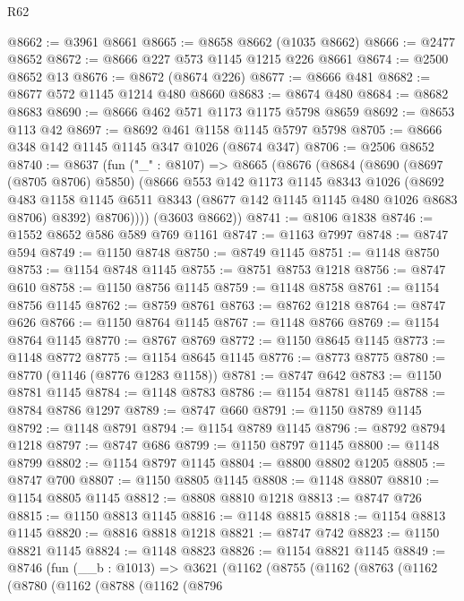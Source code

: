 \begin{lexlean}{R62}
\begin{coremodule}
@8662 := @3961 @8661
@8665 := @8658 @8662 (@1035 @8662)
@8666 := @2477 @8652
@8672 := @8666 @227 @573 @1145 @1215 @226 @8661
@8674 := @2500 @8652 @13
@8676 := @8672 (@8674 @226)
@8677 := @8666 @481
@8682 := @8677 @572 @1145 @1214 @480 @8660
@8683 := @8674 @480
@8684 := @8682 @8683
@8690 := @8666 @462 @571 @1173 @1175 @5798 @8659
@8692 := @8653 @113 @42
@8697 := @8692 @461 @1158 @1145 @5797 @5798
@8705 := @8666 @348 @142 @1145 @1145 @347 @1026 (@8674 @347)
@8706 := @2506 @8652
@8740 := @8637
    (fun ("_" : @8107) =>
    @8665
      (@8676
        (@8684
          (@8690
            (@8697 (@8705 @8706) @5850)
            (@8666
              @553
              @142
              @1173
              @1145
              @8343
              @1026
              (@8692
                @483
                @1158
                @1145
                @6511
                @8343
                (@8677 @142 @1145 @1145 @480 @1026 @8683 @8706)
                @8392)
              @8706))))
      (@3603 @8662))
@8741 := @8106 @1838
@8746 := @1552 @8652 @586 @589 @769 @1161
@8747 := @1163 @7997
@8748 := @8747 @594
@8749 := @1150 @8748
@8750 := @8749 @1145
@8751 := @1148 @8750
@8753 := @1154 @8748 @1145
@8755 := @8751 @8753 @1218
@8756 := @8747 @610
@8758 := @1150 @8756 @1145
@8759 := @1148 @8758
@8761 := @1154 @8756 @1145
@8762 := @8759 @8761
@8763 := @8762 @1218
@8764 := @8747 @626
@8766 := @1150 @8764 @1145
@8767 := @1148 @8766
@8769 := @1154 @8764 @1145
@8770 := @8767 @8769
@8772 := @1150 @8645 @1145
@8773 := @1148 @8772
@8775 := @1154 @8645 @1145
@8776 := @8773 @8775
@8780 := @8770 (@1146 (@8776 @1283 @1158))
@8781 := @8747 @642
@8783 := @1150 @8781 @1145
@8784 := @1148 @8783
@8786 := @1154 @8781 @1145
@8788 := @8784 @8786 @1297
@8789 := @8747 @660
@8791 := @1150 @8789 @1145
@8792 := @1148 @8791
@8794 := @1154 @8789 @1145
@8796 := @8792 @8794 @1218
@8797 := @8747 @686
@8799 := @1150 @8797 @1145
@8800 := @1148 @8799
@8802 := @1154 @8797 @1145
@8804 := @8800 @8802 @1205
@8805 := @8747 @700
@8807 := @1150 @8805 @1145
@8808 := @1148 @8807
@8810 := @1154 @8805 @1145
@8812 := @8808 @8810 @1218
@8813 := @8747 @726
@8815 := @1150 @8813 @1145
@8816 := @1148 @8815
@8818 := @1154 @8813 @1145
@8820 := @8816 @8818 @1218
@8821 := @8747 @742
@8823 := @1150 @8821 @1145
@8824 := @1148 @8823
@8826 := @1154 @8821 @1145
@8849 := @8746
    (fun (__b : @1013) =>
    @3621
      (@1162
        (@8755
          (@1162
            (@8763
              (@1162
                (@8780
                  (@1162
                    (@8788
                      (@1162
                        (@8796

\end{coremodule}
\end{lexlean}
